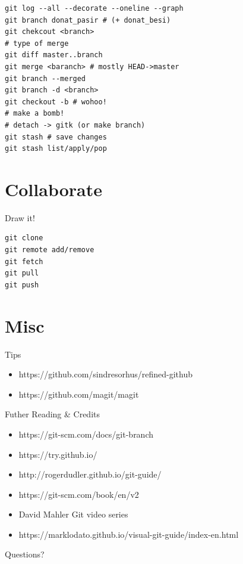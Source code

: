 \documentclass[notes,usenames,dvipsnames]{beamer}       %
\begin{document}
\begin{frame}[fragile]%
\begin{verbatim}
git log --all --decorate --oneline --graph
git branch donat_pasir # (+ donat_besi)
git chekcout <branch>
# type of merge
git diff master..branch
git merge <baranch> # mostly HEAD->master
git branch --merged
git branch -d <branch>
git checkout -b # wohoo!
# make a bomb!
# detach -> gitk (or make branch)
git stash # save changes
git stash list/apply/pop
\end{verbatim}
\end{frame}

\section{Collaborate}

\begin{frame}%
  \begin{center}
    \Huge Draw it!
  \end{center}
\end{frame}

\begin{frame}[fragile]%
\begin{verbatim}
git clone
git remote add/remove
git fetch
git pull
git push
\end{verbatim}
\end{frame}

\section{Misc}

\begin{frame}{Tips}
  \begin{center}
    \begin{itemize}
    \item https://github.com/sindresorhus/refined-github
    \item https://github.com/magit/magit
    \end{itemize}
  \end{center}
\end{frame}

\begin{frame}{Futher Reading \& Credits}
  \begin{center}
    \begin{itemize}
    \item https://git-scm.com/docs/git-branch
    \item https://try.github.io/
    \item http://rogerdudler.github.io/git-guide/
    \item https://git-scm.com/book/en/v2
    \item  David Mahler Git video series
    \item https://marklodato.github.io/visual-git-guide/index-en.html
    \end{itemize}
  \end{center}
\end{frame}


\begin{frame}[standout]
  \Huge Questions?
\end{frame}
\end{document}

